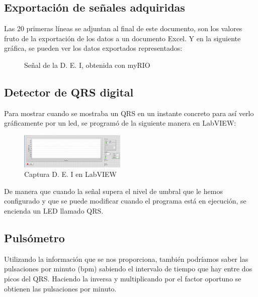 \documentclass[conference]{IEEEtran}
\begin{document}
\subsection{Exportación de señales adquiridas}
Las 20 primeras líneas se adjuntan al final de este documento, son los valores fruto de la exportación de los datos a un documento Excel.
Y en la siguiente gráfica, se pueden ver los datos exportados representados:
\begin{figure}[H]
    \caption{Señal de la D. E. I, obtenida con myRIO}
    \label{g_myRIO}
    \end{figure}

\subsection{Detector de QRS digital}
Para mostrar cuando se mostraba un QRS en un instante concreto para así verlo gráficamente por un led, se programó de la siguiente manera en LabVIEW:
\begin{figure}[H]
    \centerline{\includegraphics[width=0.45\textwidth]{e_captura.png}}
    \caption{Captura D. E. I en LabVIEW}
    \end{figure}

De manera que cuando la señal supera el nivel de umbral que le hemos configurado y que se puede modificar cuando el programa está en ejecución, se encienda un LED llamado QRS.

\subsection{Pulsómetro}
Utilizando la información que se nos proporciona, también podríamos saber las pulsaciones por minuto (bpm) sabiendo el intervalo de tiempo que hay entre dos picos del QRS. Haciendo la inversa y multiplicando por el factor oportuno se obtienen las pulsaciones por minuto.
\end{document}
